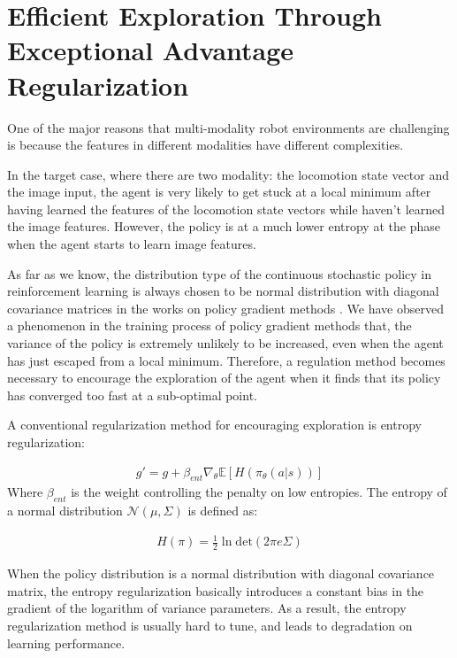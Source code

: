 \section{Efficient Exploration Through Exceptional Advantage Regularization}\label{sec_method_expadv_reg}
One of the major reasons that multi-modality robot environments are challenging is because the features in different modalities have different complexities.

In the target case, where there are two modality: the locomotion state vector and the image input, the agent is very likely to get stuck at a local minimum after having learned the features of the locomotion state vectors while haven't learned the image features. However, the policy is at a much lower entropy at the phase when the agent starts to learn image features.

As far as we know, the distribution type of the continuous stochastic policy in reinforcement learning is always chosen to be normal distribution with diagonal covariance matrices in the works on policy gradient methods . We have observed a phenomenon in the training process of policy gradient methods that, the variance of the policy is extremely unlikely to be increased, even when the agent has just escaped from a local minimum. Therefore, a regulation method becomes necessary to encourage the exploration of the agent when it finds that its policy has converged too fast at a sub-optimal point.

A conventional regularization method for encouraging exploration is entropy regularization:

\begin{align}
g' = g +\beta_{ent}\nabla_\theta \mathbb{E}[ H(\pi_\theta(a|s)) ]
\end{align}
Where $\beta_{ent}$ is the weight controlling the penalty on low entropies.
The entropy of a normal distribution $\mathcal{N}(\mu,\Sigma)$ is defined as:

\begin{align}
	H(\pi) =  \frac{1}{2} \ln \mathrm{det}(2\pi e \Sigma)
\end{align}

When the policy distribution is a normal distribution with diagonal covariance matrix, the entropy regularization basically introduces a constant bias in the gradient of the logarithm of variance parameters. As a result, the entropy regularization method is usually hard to tune, and leads to degradation on learning performance.

